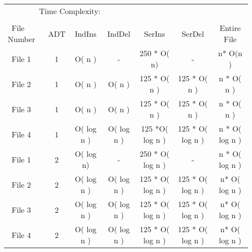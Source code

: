 \documentclass[8]{report}
\begin{document}
\begin{table}[ht]



\begin{adjustbox}{width=1.35\textwidth}
\begin{threeparttable}

\begin{tabular}{l*{6}{c}}
 \multicolumn{4}{c}{Time Complexity:} \\
   &\multicolumn{1}{c}{}  &\multicolumn{1}{c}{}   &\multicolumn{1}{c}{} &\multicolumn{1}{c}{}  &\multicolumn{1}{c}{}   \\
\hline\hline


     \ File Number         &\multicolumn{1}{c}{ADT}  &\multicolumn{1}{c}{IndIns}   &\multicolumn{1}{c}{IndDel} &\multicolumn{1}{c}{SerIns}  &\multicolumn{1}{c}{SerDel}  &\multicolumn{1}{c}{Entire File}  \\


\hline


\ File 1 	&      1     &     O( n )  &    -   &   250 * O( n)    &  -   & n* O(n )   \\
                       

\ File 2 	&      1     &      O( n )   &   O( n ) 	&   125 * O( n )   &   125 * O( n )     & n * O( n )  \\
                  
\ File 3 	&      1     &      O( n )   &   O( n ) 	&    125 * O( n )   &    125 * O( n )     & n * O( n )  \\     
 \ File 4 	&      1     &      O( log n )   &   O( log n ) 	&    125 *O( log n )   &    125 * O( log n )     & n * O( log n )  \\

 

 
 
 

\ File 1 	&      2    &     O( log n)  &    -  		&   250 * O( log n )    &  -   &  n * O( log n )   \\
                       

\ File 2 	&      2     &      O( log n )   &   O( log n ) 	&    125 * O( log n )   &   125 *  O( log n )     & n* O( log n  )  \\
                  
\ File 3 	&      2     &      O( log n )   &   O( log n ) 	&    125 * O( log n )   &   125 *  O( log n )     & n* O( log n  )  \\ 
 \ File 4 	&      2     &      O( log n )   &   O( log n ) 	&    125 * O( log n )   &   125 *  O( log n )     & n* O( log n  )  \\ 
 

\end{tabular}
\end{threeparttable}
\end{adjustbox}
\end{table}
\end{document}
